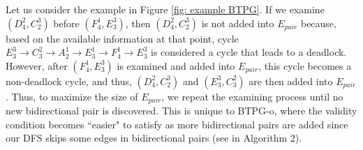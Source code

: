 \documentclass[letterpaper]{article} %
\theoremstyle{definition}
\newcommand{\rishi}[1]{\textcolor{black}{\textbf{Rishi:}} 
\textcolor{purple}{#1}}
\begin{document}

%          
%          



Let us consider the example in Figure \ref{fig: example BTPG}.
If we examine $(D^2_4,C^3_2)$ before $(F^1_4,E^3_3)$, then $(D^2_4,C^3_2)$ is not added into $E_{pair}$ because, based on the available information at that point, cycle $E^3_3 \rightarrow C^2_3 \rightarrow A^1_2  \rightarrow E^1_3 \rightarrow F^1_4 \rightarrow E^3_3$ is considered a cycle that leads to a deadlock. However, after $(F^1_4, E^3_3)$ is examined and added into $E_{pair}$, this cycle becomes a non-deadlock cycle, and thus, $(D^2_4,C^3_2)$ and $(E^3_3,C^2_3)$ are then added into $E_{pair}$.
Thus, to maximize the size of $E_{pair}$, we repeat the examining process until no new bidirectional pair is discovered. This is unique to BTPG-o, where the validity condition becomes ``easier" to satisfy as more bidirectional pairs are added since our DFS skips some edges in bidirectional pairs (see  in Algorithm 2). %
\end{document}
